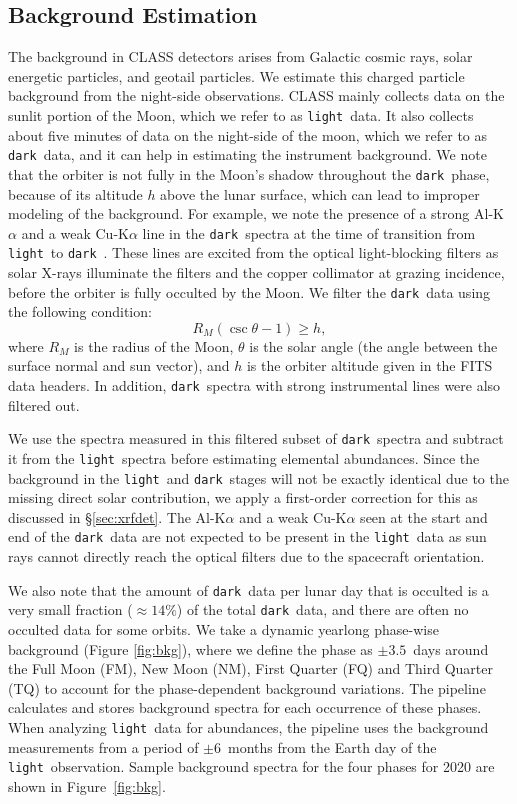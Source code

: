 \documentclass[twocolumn,linenumbers]{aastex631}
\newcommand{\dark}{\texttt{dark}~}
\newcommand{\light}{\texttt{light}~}
\begin{document}
\subsection{Background Estimation}\label{sec:bkgest}
The background in CLASS detectors arises from Galactic cosmic rays, solar energetic particles, and geotail particles. We estimate this charged particle background from the night-side observations. 
CLASS mainly collects data on the sunlit portion of the Moon, which we refer to as \light data. It also collects about five minutes of data on the night-side of the moon, which we refer to as \dark data, and it can help in estimating the instrument background.
We note that the orbiter is not fully in the Moon's shadow throughout the \dark phase, because of its altitude $h$ above the lunar surface, which can lead to improper modeling of the background. For example, we note the presence of a strong Al-K$\alpha$ and a weak Cu-K$\alpha$ line in the \dark spectra at the time of transition from \light to \dark. These lines are excited from the optical light-blocking filters as solar X-rays illuminate the filters and the copper collimator at grazing incidence, before the orbiter is fully occulted by the Moon.
We filter the \dark data using the following condition:
\begin{equation}
R_M (\csc \theta - 1) \geq h ,
\end{equation}
where $R_M$ is the radius of the Moon, $\theta$ is the solar angle (the angle between the surface normal and sun vector), and $h$ is the orbiter altitude given in the FITS data headers. In addition, \dark spectra with strong instrumental lines were also filtered out.

We use the spectra measured in this filtered subset of \dark spectra and subtract it from the \light spectra before estimating elemental abundances. 
Since the background in the \light and \dark stages will not be exactly identical due to the missing direct solar contribution, we apply a first-order correction for this as discussed in \S\ref{sec:xrfdet}. The Al-K$\alpha$ and a weak Cu-K$\alpha$ seen at the start and end of the \dark data are not expected to be present in the \light data as sun rays cannot directly reach the optical filters due to the spacecraft orientation.

We also note that the amount of \dark data per lunar day that is occulted is a very small fraction ($\approx 14\%$) of the total \dark data, and there are often no occulted data for some orbits. We take a dynamic yearlong phase-wise background (Figure \ref{fig:bkg}), where we define the phase as $\pm 3.5$~days around the Full Moon (FM), New Moon (NM), First Quarter (FQ) and Third Quarter (TQ) to account for the phase-dependent background variations. The pipeline calculates and stores background spectra for each occurrence of these phases. When analyzing \light data for abundances, the pipeline uses the background measurements from a period of $\pm 6$~months from the Earth day of the \light observation. Sample background spectra for the four phases for 2020 are shown in Figure~\ref{fig:bkg}.
\end{document}
